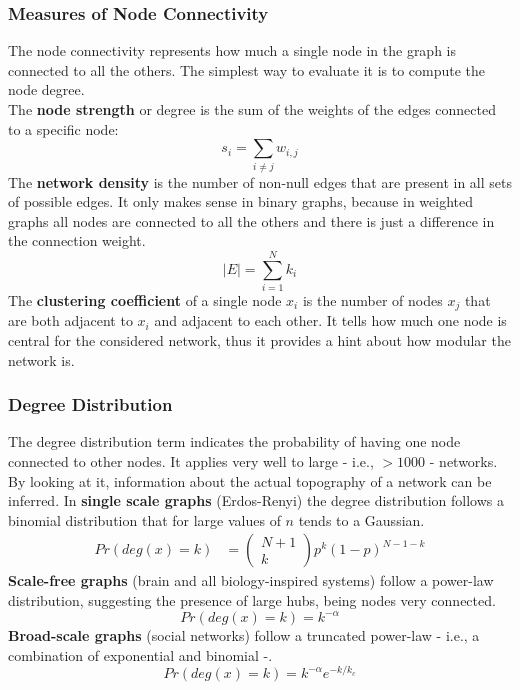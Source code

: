 \subsubsection{Measures of Node Connectivity}
The node connectivity represents how much a single node in the graph is connected to all the others.
The simplest way to evaluate it is to compute the node degree.\\
The \textbf{node strength} or degree is the sum of the weights of the edges connected to a specific node:
\begin{equation*}
    s_i=\sum_{i\neq j}w_{i,j}
\end{equation*}
The \textbf{network density} is the number of non-null edges that are present in all sets of possible edges.
It only makes sense in binary graphs, because in weighted graphs all nodes are connected to all the others and
there is just a difference in the connection weight.
\begin{equation*}
    |E|=\sum_{i=1}^{N} k_i
\end{equation*}
The \textbf{clustering coefficient} of a single node \(x_i\) is the number of nodes \(x_j\) that are both adjacent to
\(x_i\) and adjacent to each other. It tells how much one node is central for the considered network, thus it provides
a hint about how modular the network is.
\subsubsection{Degree Distribution}
The degree distribution term indicates the probability of having one node connected to other nodes. It applies very well
to large - i.e., \(>1000\) - networks. By looking at it, information about the actual topography of a network
can be inferred. In \textbf{single scale graphs} (Erdos-Renyi) the degree distribution follows a binomial distribution
that for large values of \(n\) tends to a Gaussian.
\begin{align*}
    Pr(deg(x)=k) & = \begin{pmatrix}
                         N+1 \\
                         k
                     \end{pmatrix}
    p^k(1-p)^{N-1-k}
\end{align*}
\textbf{Scale-free graphs} (brain and all biology-inspired systems) follow a power-law distribution, suggesting the
presence of large hubs, being nodes very connected.
\begin{equation*}
    Pr(deg(x)=k)=k^{-\alpha}
\end{equation*}
\textbf{Broad-scale graphs} (social networks) follow a truncated power-law - i.e., a combination of exponential and binomial -.
\begin{equation*}
    Pr(deg(x)=k)=k^{-\alpha}e^{-k/k_c}
\end{equation*}
